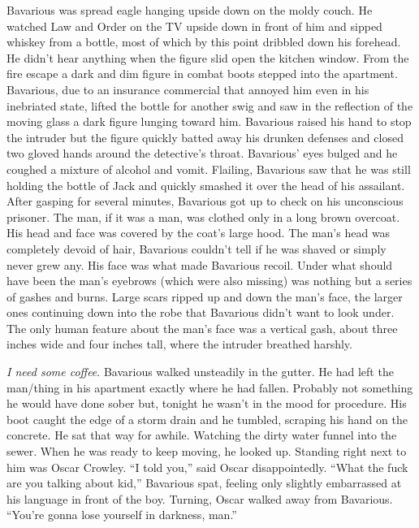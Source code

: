 Bavarious was spread eagle hanging upside down on the moldy couch.
He watched Law and Order on the TV upside down in front of him and
sipped whiskey from a bottle, most of which by this point dribbled
down his forehead. He didn't hear anything when the figure
slid open the kitchen window. From the fire escape a dark and dim
figure in combat boots stepped into the apartment. Bavarious, due
to an insurance commercial that annoyed him even in his inebriated
state, lifted the bottle for another swig and saw in the reflection
of the moving glass a dark figure lunging toward him. Bavarious
raised his hand to stop the intruder but the figure quickly batted
away his drunken defenses and closed two gloved hands around the
detective's throat. Bavarious' eyes bulged and he
coughed a mixture of alcohol and vomit. Flailing, Bavarious saw
that he was still holding the bottle of Jack and quickly smashed it
over the head of his assailant. After gasping for several minutes,
Bavarious got up to check on his unconscious prisoner. The man, if
it was a man, was clothed only in a long brown overcoat. His head
and face was covered by the coat's large hood. The
man's head was completely devoid of hair, Bavarious
couldn't tell if he was shaved or simply never grew any. His
face was what made Bavarious recoil. Under what should have been
the man's eyebrows (which were also missing) was nothing but
a series of gashes and burns. Large scars ripped up and down the
man's face, the larger ones continuing down into the robe
that Bavarious didn't want to look under. The only human
feature about the man's face was a vertical gash, about three
inches wide and four inches tall, where the intruder breathed
harshly.



{\em I need some coffee}. Bavarious walked unsteadily in the
gutter. He had left the man/thing in his apartment exactly where he
had fallen. Probably not something he would have done sober but,
tonight he wasn't in the mood for procedure. His boot caught
the edge of a storm drain and he tumbled, scraping his hand on the
concrete. He sat that way for awhile. Watching the dirty water
funnel into the sewer. When he was ready to keep moving, he looked
up. Standing right next to him was Oscar Crowley. ``I told
you,'' said Oscar disappointedly. ``What the fuck are you
talking about kid,'' Bavarious spat, feeling only slightly
embarrassed at his language in front of the boy. Turning, Oscar
walked away from Bavarious. ``You're gonna lose yourself
in darkness, man.''



